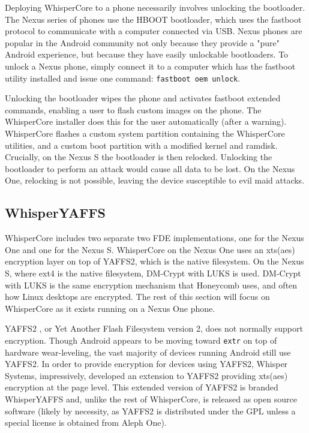 Deploying WhisperCore to a phone necessarily involves unlocking the bootloader.  The Nexus series of phones use the HBOOT
bootloader, which uses the fastboot protocol to communicate with a computer connected via USB.  Nexus phones are popular in the
Android community not only because they provide a "pure" Android experience, but because they have easily unlockable bootloaders.
To unlock a Nexus phone, simply connect it to a computer which has the fastboot utility installed and issue one command:
\texttt{fastboot oem unlock}.

Unlocking the bootloader wipes the phone and activates fastboot extended commands, enabling a user to flash custom images on the phone. 
The WhisperCore installer does this for the user automatically (after a warning). 
WhisperCore flashes a custom system partition containing the WhisperCore utilities, and a custom boot partition with a modified kernel and ramdisk. 
Crucially, on the Nexus S the bootloader is then relocked. 
Unlocking the bootloader to perform an attack would cause all data to be lost. 
On the Nexus One, relocking is not possible, leaving the device susceptible to evil maid attacks. 

\subsection{WhisperYAFFS}
WhisperCore includes two separate two FDE implementations, one for the Nexus One and one for the Nexus S. WhisperCore on the Nexus
One uses an xts(aes) encryption layer on top of YAFFS2, which is the native filesystem.  On the Nexus S, where ext4 is the native
filesystem, DM-Crypt with LUKS is used.  DM-Crypt with LUKS is the same encryption mechanism that Honeycomb uses, and often how
Linux desktops are encrypted.  The rest of this section will focus on WhisperCore as it exists running on a Nexus One phone.

YAFFS2 \cite{howyaffsworks}, or Yet Another Flash Filesystem version 2, does not normally support encryption.  Though Android
appears to be moving toward \texttt{extr} on top of hardware wear-leveling, the vast majority of devices running Android still use
YAFFS2.  In order to provide encryption for devices using YAFFS2, Whisper Systems, impressively, developed an extension to YAFFS2
providing xts(aes) encryption at the page level.  This extended version of YAFFS2 is branded WhisperYAFFS and, unlike the rest of
WhisperCore, is released as open source software (likely by necessity, as YAFFS2 is distributed under the GPL unless a special
license is obtained from Aleph One).

